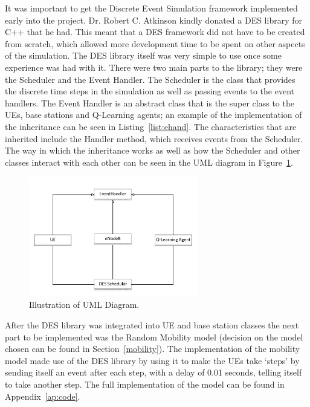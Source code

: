 It was important to get the Discrete Event Simulation framework implemented early into the project. Dr. Robert C. Atkinson kindly donated a DES library for C++ that he had. This meant that a DES framework did not have to be created from scratch, which allowed more development time to be spent on other aspects of the simulation. The DES library itself was very simple to use once some experience was had with it. There were two main parts to the library; they were the Scheduler and the Event Handler. The Scheduler is the class that provides the discrete time steps in the simulation as well as passing events to the event handlers. The Event Handler is an abstract class that is the super class to the UEs, base stations and Q-Learning agents; an example of the implementation of the inheritance can be seen in Listing~\ref{list:ehand}. The characteristics that are inherited include the Handler method, which receives events from the Scheduler. The way in which the inheritance works as well as how the Scheduler and other classes interact with each other can be seen in the UML diagram in Figure~\ref{fig:uml}. 

\begin{figure}[H]
  \begin{center}
    	  \includegraphics[width=0.66\textwidth]{figures/simulation/uml.pdf}
    \end{center}
    \caption{Illustration of UML Diagram.}
    \label{fig:uml}
\end{figure}
After the DES library was integrated into UE and base station classes the next part to be implemented was the Random Mobility model (decision on the model chosen can be found in Section~\ref{mobility}). The implementation of the mobility model made use of the DES library by using it to make the UEs take `steps’ by sending itself an event after each step, with a delay of 0.01 seconds, telling itself to take another step. The full implementation of the model can be found in Appendix~\ref{ap:code}. 

